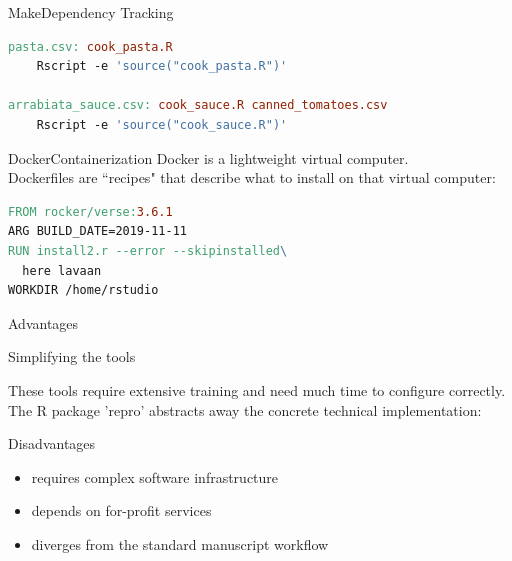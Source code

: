 \documentclass[12pt,t]{beamer}
\begin{document}
{\begin{frame}[c, fragile]{Make\textemdash{}Dependency Tracking}
\begin{lstlisting}[language=make,basicstyle=\ttfamily\scriptsize]
pasta.csv: cook_pasta.R
    Rscript -e 'source("cook_pasta.R")'

arrabiata_sauce.csv: cook_sauce.R canned_tomatoes.csv
    Rscript -e 'source("cook_sauce.R")'
\end{lstlisting}
\end{frame}

\begin{frame}[c, fragile]{Docker\textemdash{}Containerization}
	Docker is a lightweight virtual computer.\\
	Dockerfiles are ``recipes" that describe what to install on that virtual computer:
	\vspace{10mm}
	\begin{lstlisting}[language=make,basicstyle=\ttfamily\scriptsize]
FROM rocker/verse:3.6.1
ARG BUILD_DATE=2019-11-11
RUN install2.r --error --skipinstalled\
  here lavaan
WORKDIR /home/rstudio
\end{lstlisting}
\end{frame}

  \begin{frame}[plain, c]
 
  \end{frame}
}

\begin{frame}[c]{Advantages}
	\begin{center}
	\end{center}
\end{frame}

\begin{frame}[c]{Simplifying the tools}

\textcolor<2->{lolit}{These tools require extensive training and need much time to configure correctly.\\}
\onslide<2->\textcolor<3->{lolit}{The R package 'repro' abstracts away the concrete technical implementation:\\}
\onslide<3->{\centering \Huge Live Demo}

\end{frame}

\begin{frame}[c]{Disadvantages}
\begin{itemize}
	\item requires complex software infrastructure
	\item depends on for-profit services
	\item diverges from the standard manuscript workflow
\end{itemize}
\end{frame}
\end{document}
